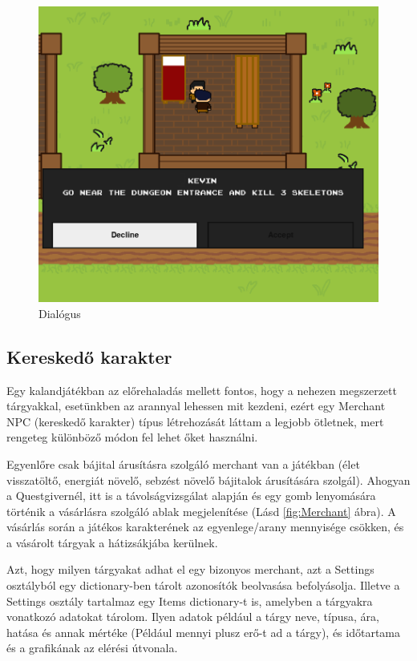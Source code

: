 \begin{figure}[H]
    \centering
    \includegraphics[width=10.0truecm]{images/dialogue.png}
    \caption{Dialógus}
    \label{fig:Dialógus rendszer}
\end{figure}

\subsection{Kereskedő karakter}

\indent \indent Egy kalandjátékban az előrehaladás mellett fontos, hogy a nehezen megszerzett tárgyakkal,
 esetünkben az arannyal lehessen mit kezdeni, ezért egy Merchant NPC (kereskedő karakter) típus létrehozását láttam a legjobb ötletnek,
  mert rengeteg különböző módon fel lehet őket használni. 

Egyenlőre csak bájital árusításra szolgáló merchant van a játékban (élet visszatöltő, energiát növelő, sebzést növelő bájitalok árusítására szolgál).
   Ahogyan a Questgivernél, itt is a távolságvizsgálat alapján és egy gomb lenyomására történik a vásárlásra szolgáló ablak megjelenítése (Lásd \ref{fig:Merchant} ábra).
     A vásárlás során a játékos karakterének az egyenlege/arany mennyisége csökken, és a vásárolt tárgyak a hátizsákjába kerülnek.

Azt, hogy milyen tárgyakat adhat el egy bizonyos merchant, azt a Settings osztályból egy dictionary-ben tárolt azonosítók beolvasása befolyásolja.
 Illetve a Settings osztály tartalmaz egy Items dictionary-t is, amelyben a tárgyakra vonatkozó adatokat tárolom.
  Ilyen adatok például a tárgy neve, típusa, ára, hatása és annak mértéke (Például mennyi plusz erő-t ad a tárgy),
   és időtartama és a grafikának az elérési útvonala.  

